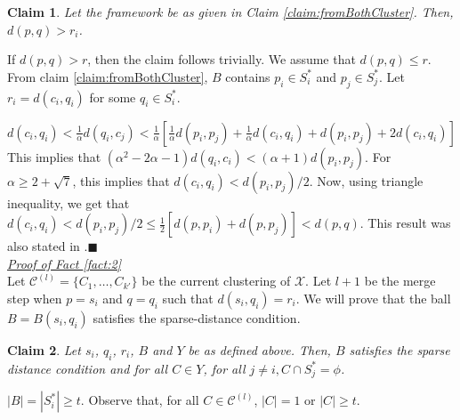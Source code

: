 \documentclass[orivec]{llncs}
\newtheorem{smallLemma}{Claim}
\newcommand{\mc}{\mathcal}
\renewcommand{\qed}{\hfill\ensuremath{\blacksquare}}
\begin{document}
\begin{smallLemma}
\label{claim:maxrirj}
Let the framework be as given in Claim \ref{claim:fromBothCluster}. Then, $d(p, q) > r_i$.
\end{smallLemma}

\vspace{-0.1in} \noindent If $d(p, q) > r$, then the claim follows trivially. We assume that $d(p, q) \le r$. From claim \ref{claim:fromBothCluster}, $B$ contains $p_i \in S_i^*$ and $p_j \in S_j^*$. Let $r_i = d(c_i, q_i)$ for some $q_i \in S_i^*$.

$d(c_i, q_i) < \frac{1}{\alpha} d(q_i, c_j) < \frac{1}{\alpha} [ \frac{1}{\alpha}d(p_i, p_j) + \frac{1}{\alpha}d(c_i, q_i) + d(p_i, p_j) + 2d(c_i, q_i)]$
This implies that $(\alpha^2 - 2\alpha - 1)d(q_i, c_i) < (\alpha + 1) d(p_i, p_j)$. For $\alpha \ge 2 + \sqrt 7$, this implies that $d(c_i, q_i) < d(p_i, p_j)/2$. Now, using triangle inequality, we get that $d(c_i, q_i) < d(p_i, p_j)/2 \le \frac{1}{2}[d(p, p_i) + d(p, p_j)] < d(p, q)$. This result was also stated in \cite{balcan2012clustering}.\qed\\

\noindent\textit{\underline{Proof of Fact \ref{fact:2}
}}\\
Let $\mc C^{(l)} = \{C_1, \ldots, C_{k'}\}$ be the current clustering of $\mc X$. Let $l+1$ be the merge step when $p = s_i$ and $q = q_i$ such that $d(s_i, q_i) = r_i$. We will prove that the ball $B = B(s_i, q_i)$ satisfies the sparse-distance condition.

\begin{smallLemma}
\label{claim:dciqi}
Let $s_i$, $q_i$, $r_i$, $B$ and $Y$ be as defined above. Then, $B$ satisfies the sparse distance condition and for all $C \in Y$, for all $j \neq i, C \cap S_j^* = \phi$.
\end{smallLemma}
\vspace{-0.1in} $|B| = |S_i^*| \ge t$. Observe that, for all $C \in \mc C^{(l)}$, $|C| = 1$ or $|C| \ge t$. 
\end{document}
